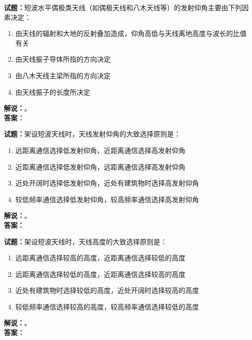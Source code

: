 \documentclass{ctexbook}
\begin{document}
\vspace{\baselineskip}

\noindent\textbf{试题：}短波水平偶极类天线（如偶极天线和八木天线等）的发射仰角主要由下列因素决定：
\begin{enumerate}[leftmargin=3em]
  \item 由天线的辐射和大地的反射叠加造成，仰角高低与天线离地高度与波长的比值有关
  \item 由天线振子导体所指的方向决定
  \item 由八木天线主梁所指的方向决定
  \item 由天线振子的长度所决定
\end{enumerate}
\noindent\textbf{解说：}\textbf{}。\\\noindent\textbf{答案：}

\vspace{\baselineskip}

\noindent\textbf{试题：}架设短波天线时，天线发射仰角的大致选择原则是：
\begin{enumerate}[leftmargin=3em]
  \item 远距离通信选择低发射仰角，近距离通信选择高发射仰角
  \item 近距离通信选择低发射仰角，远距离通信选择高发射仰角
  \item 近处开阔时选择低发射仰角，近处有建筑物时选择高发射仰角
  \item 较低频率通信选择低发射仰角，较高频率通信选择高发射仰角
\end{enumerate}
\noindent\textbf{解说：}\textbf{}。\\\noindent\textbf{答案：}

\vspace{\baselineskip}

\noindent\textbf{试题：}架设短波天线时，天线高度的大致选择原则是：
\begin{enumerate}[leftmargin=3em]
  \item 远距离通信选择较高的高度，近距离通信选择较低的高度
  \item 远距离通信选择较低的高度，近距离通信选择较高的高度
  \item 近处有建筑物时选择较低的高度，近处开阔时选择较高的高度
  \item 较低频率通信选择较高的高度，较高频率通信选择较低的高度
\end{enumerate}
\noindent\textbf{解说：}\textbf{}。\\\noindent\textbf{答案：}

\vspace{\baselineskip}
\end{document}
